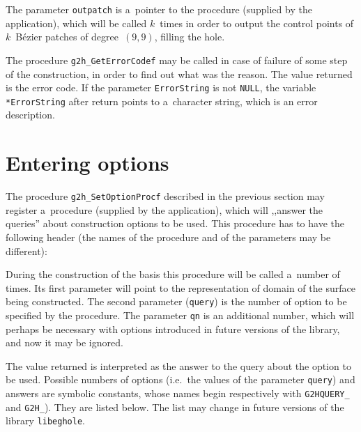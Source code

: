 The parameter \texttt{outpatch} is a~pointer to the procedure (supplied
by the application), which will be called $k$~times in order to output
the control points of $k$~B\'{e}zier patches of degree~$(9,9)$, filling the
hole.


\vspace{\bigskipamount}
The procedure \texttt{g2h\_GetErrorCodef} may be called in case of failure
of some step of the construction, in order to find out what was the reason.
The value returned is the error code. If the parameter \texttt{ErrorString}
is not \texttt{NULL}, the variable \texttt{*ErrorString} after return
points to a~character string, which is an error description.


\section{\label{ssect:g2h:options}Entering options}

The procedure \texttt{g2h\_SetOptionProcf} described in the previous section
may register a~procedure (supplied by the application), which will ,,answer
the queries'' about construction options to be used. This procedure has to
have the following header
(the names of the procedure and of the parameters may be different):

\vspace{\medskipamount}

\vspace{\medskipamount}
During the construction of the basis this procedure will be called a~number
of times. Its first parameter will point to the representation of domain
of the surface being constructed. The second parameter (\texttt{query})
is the number of option to be specified by the procedure. The parameter
\texttt{qn} is an additional number, which will perhaps be necessary with
options introduced in future versions of the library, and now it may be
ignored.

The value returned is interpreted as the answer to the query about the option
to be used. Possible numbers of options (i.e.\ the values of the parameter
\texttt{query}) and answers are symbolic constants, whose names begin
respectively with \texttt{G2HQUERY\_} and \texttt{G2H\_}).
They are listed below. The list may change in future versions
of the library \texttt{libeghole}.

